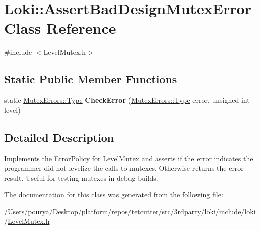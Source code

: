 \hypertarget{classLoki_1_1AssertBadDesignMutexError}{}\section{Loki\+:\+:Assert\+Bad\+Design\+Mutex\+Error Class Reference}
\label{classLoki_1_1AssertBadDesignMutexError}


{\ttfamily \#include $<$Level\+Mutex.\+h$>$}

\subsection*{Static Public Member Functions}
\begin{DoxyCompactItemize}
\item 
\hypertarget{classLoki_1_1AssertBadDesignMutexError_a76076f2987ed529a6cdd2c0f478a2f67}{}static \hyperlink{classLoki_1_1MutexErrors_acd0eb6065ca303083d2e0229d7bff590}{Mutex\+Errors\+::\+Type} {\bfseries Check\+Error} (\hyperlink{classLoki_1_1MutexErrors_acd0eb6065ca303083d2e0229d7bff590}{Mutex\+Errors\+::\+Type} error, unsigned int level)\label{classLoki_1_1AssertBadDesignMutexError_a76076f2987ed529a6cdd2c0f478a2f67}

\end{DoxyCompactItemize}


\subsection{Detailed Description}
Implements the Error\+Policy for \hyperlink{classLoki_1_1LevelMutex}{Level\+Mutex} and asserts if the error indicates the programmer did not levelize the calls to mutexes. Otherwise returns the error result. Useful for testing mutexes in debug builds. 

The documentation for this class was generated from the following file\+:\begin{DoxyCompactItemize}
\item 
/\+Users/pourya/\+Desktop/platform/repos/tetcutter/src/3rdparty/loki/include/loki/\hyperlink{LevelMutex_8h}{Level\+Mutex.\+h}\end{DoxyCompactItemize}
